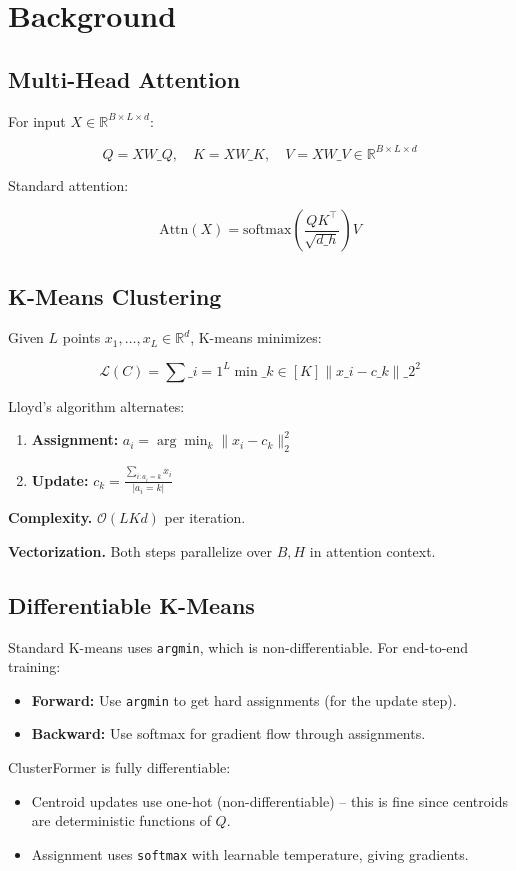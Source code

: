 \section{Background}

\subsection{Multi-Head Attention}

For input $X \in \mathbb{R}^{B \times L \times d}$:

\[
Q = X W\_Q, \quad K = X W\_K, \quad V = X W\_V \in \mathbb{R}^{B \times L \times d}
\]

Standard attention:

\[
\text{Attn}(X) = \text{softmax}\!\left(\frac{Q K^\top}{\sqrt{d\_h}}\right) V
\]

\subsection{K-Means Clustering}

Given $L$ points $x_1, \dots, x_L \in \mathbb{R}^d$, K-means minimizes:

\[
\mathcal{L}(C) = \sum\_{i=1}^{L} \min\_{k \in [K]} \|x\_i - c\_k\|\_2^2
\]

Lloyd's algorithm alternates:

\begin{enumerate}
\item \textbf{Assignment:} $a_i = \arg\min_k \|x_i - c_k\|_2^2$
\item \textbf{Update:} $c_k = \frac{\sum_{i: a_i = k} x_i}{|a_i = k|}$

\end{enumerate}
\textbf{Complexity.} $\mathcal{O}(L K d)$ per iteration.

\textbf{Vectorization.} Both steps parallelize over $B, H$ in attention context.

\subsection{Differentiable K-Means}

Standard K-means uses \texttt{argmin}, which is non-differentiable. For 
end-to-end training:

\begin{itemize}
\item \textbf{Forward:} Use \texttt{argmin} to get hard assignments (for the update step).
\item \textbf{Backward:} Use softmax for gradient flow through assignments.

\end{itemize}
ClusterFormer is fully differentiable:
\begin{itemize}
\item Centroid updates use one-hot (non-differentiable) -- this is fine since
  centroids are deterministic functions of $Q$.
\item Assignment uses \texttt{softmax} with learnable temperature, giving gradients.

\end{itemize}
